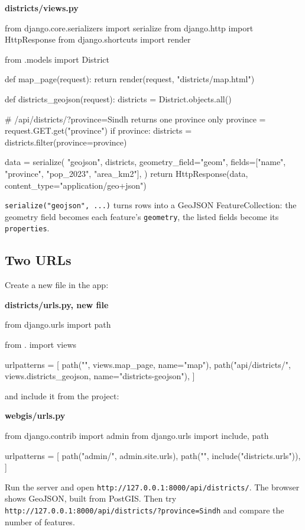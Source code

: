 \documentclass{article}
\newcommand{\cd}[1]{\texttt{#1}}
\newcommand{\cdb}[1]{\nolinkurl{#1}}
\newcommand{\codecap}[1]{%
  \par\vspace{.9em}\noindent\textbf{#1}\par\vspace{-.6em}}
\begin{document}
\codecap{districts/views.py}
\begin{code}
from django.core.serializers import serialize
from django.http import HttpResponse
from django.shortcuts import render

from .models import District


def map_page(request):
    return render(request, "districts/map.html")


def districts_geojson(request):
    districts = District.objects.all()

    # /api/districts/?province=Sindh returns one province only
    province = request.GET.get("province")
    if province:
        districts = districts.filter(province=province)

    data = serialize(
        "geojson",
        districts,
        geometry_field="geom",
        fields=["name", "province", "pop_2023", "area_km2"],
    )
    return HttpResponse(data, content_type="application/geo+json")
\end{code}

\cd{serialize("geojson", ...)} turns rows into a GeoJSON
FeatureCollection: the geometry field becomes each feature's
\cd{geometry}, the listed fields become its \cd{properties}.

\subsection{Two URLs}

Create a new file in the app:

\codecap{districts/urls.py, new file}
\begin{code}
from django.urls import path

from . import views

urlpatterns = [
    path("", views.map_page, name="map"),
    path("api/districts/", views.districts_geojson, name="districts-geojson"),
]
\end{code}

and include it from the project:

\codecap{webgis/urls.py}
\begin{code}
from django.contrib import admin
from django.urls import include, path

urlpatterns = [
    path("admin/", admin.site.urls),
    path("", include("districts.urls")),
]
\end{code}

Run the server and open \cdb{http://127.0.0.1:8000/api/districts/}. The
browser shows GeoJSON, built from PostGIS. Then try
\cdb{http://127.0.0.1:8000/api/districts/?province=Sindh} and compare
the number of features.
\end{document}
